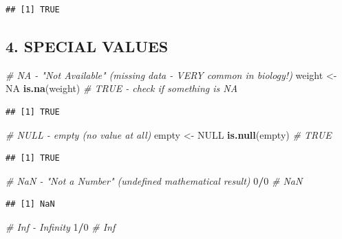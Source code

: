 \documentclass[
]{article}
\newenvironment{Shaded}{\begin{snugshade}}{\end{snugshade}}
\newcommand{\CommentTok}[1]{\textcolor[rgb]{0.56,0.35,0.01}{\textit{#1}}}
\newcommand{\ConstantTok}[1]{\textcolor[rgb]{0.56,0.35,0.01}{#1}}
\newcommand{\DecValTok}[1]{\textcolor[rgb]{0.00,0.00,0.81}{#1}}
\newcommand{\FunctionTok}[1]{\textcolor[rgb]{0.13,0.29,0.53}{\textbf{#1}}}
\newcommand{\NormalTok}[1]{#1}
\newcommand{\OtherTok}[1]{\textcolor[rgb]{0.56,0.35,0.01}{#1}}
\newcommand{\SpecialCharTok}[1]{\textcolor[rgb]{0.81,0.36,0.00}{\textbf{#1}}}
\begin{document}
\begin{verbatim}
## [1] TRUE
\end{verbatim}

\subsection{4. SPECIAL VALUES}\label{special-values}

\begin{Shaded}
\begin{Highlighting}[]
\CommentTok{\# NA {-} "Not Available" (missing data {-} VERY common in biology!)}
\NormalTok{weight }\OtherTok{\textless{}{-}} \ConstantTok{NA}
\FunctionTok{is.na}\NormalTok{(weight)  }\CommentTok{\# TRUE {-} check if something is NA}
\end{Highlighting}
\end{Shaded}

\begin{verbatim}
## [1] TRUE
\end{verbatim}

\begin{Shaded}
\begin{Highlighting}[]
\CommentTok{\# NULL {-} empty (no value at all)}
\NormalTok{empty }\OtherTok{\textless{}{-}} \ConstantTok{NULL}
\FunctionTok{is.null}\NormalTok{(empty)  }\CommentTok{\# TRUE}
\end{Highlighting}
\end{Shaded}

\begin{verbatim}
## [1] TRUE
\end{verbatim}

\begin{Shaded}
\begin{Highlighting}[]
\CommentTok{\# NaN {-} "Not a Number" (undefined mathematical result)}
\DecValTok{0}\SpecialCharTok{/}\DecValTok{0}  \CommentTok{\# NaN}
\end{Highlighting}
\end{Shaded}

\begin{verbatim}
## [1] NaN
\end{verbatim}

\begin{Shaded}
\begin{Highlighting}[]
\CommentTok{\# Inf {-} Infinity}
\DecValTok{1}\SpecialCharTok{/}\DecValTok{0}   \CommentTok{\# Inf}
\end{Highlighting}
\end{Shaded}
\end{document}
